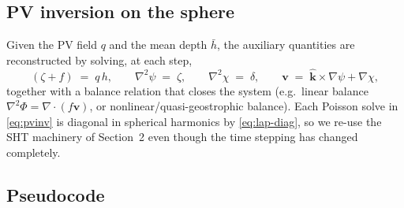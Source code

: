 \documentclass[11pt]{article}
\newcommand{\bvec}[1]{\boldsymbol{#1}}
\begin{document}
\subsection{PV inversion on the sphere}

Given the PV field $q$ and the mean depth $\bar h$, the auxiliary
quantities are reconstructed by solving, at each step,
\begin{equation}
    (\zeta + f) \;=\; q\,h,
    \qquad
    \nabla^{2}\psi \;=\; \zeta,
    \qquad
    \nabla^{2}\chi \;=\; \delta,
    \qquad
    \bvec{v} \;=\; \hat{\bvec{k}}\!\times\!\nabla\psi + \nabla\chi,
    \label{eq:pvinv}
\end{equation}
together with a balance relation that closes the system (e.g.\ linear
balance $\nabla^{2}\Phi = \nabla\!\cdot\!(f\bvec{v})$, or
nonlinear/quasi-geostrophic balance).  Each Poisson solve in
\eqref{eq:pvinv} is diagonal in spherical harmonics by
\eqref{eq:lap-diag}, so we re-use the SHT machinery of Section~2 even
though the time stepping has changed completely.

\subsection{Pseudocode}
\end{document}
